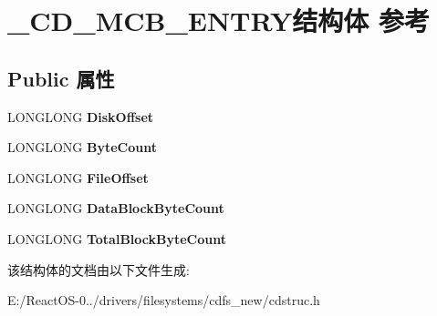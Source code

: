 \hypertarget{struct___c_d___m_c_b___e_n_t_r_y}{}\section{\+\_\+\+C\+D\+\_\+\+M\+C\+B\+\_\+\+E\+N\+T\+R\+Y结构体 参考}
\label{struct___c_d___m_c_b___e_n_t_r_y}
\subsection*{Public 属性}
\begin{DoxyCompactItemize}
\item 
\mbox{\label{struct___c_d___m_c_b___e_n_t_r_y_a5ccb3b57c1352eb1b48f175378d85a6e}} 
L\+O\+N\+G\+L\+O\+NG {\bfseries Disk\+Offset}
\item 
\mbox{\label{struct___c_d___m_c_b___e_n_t_r_y_a2e8228650e9af752e794f18417b8d61e}} 
L\+O\+N\+G\+L\+O\+NG {\bfseries Byte\+Count}
\item 
\mbox{\label{struct___c_d___m_c_b___e_n_t_r_y_aed0c738c375aa3da98fa0541e286c44e}} 
L\+O\+N\+G\+L\+O\+NG {\bfseries File\+Offset}
\item 
\mbox{\label{struct___c_d___m_c_b___e_n_t_r_y_aa401e5f28d8fa41fc50a0cd38bc90ad3}} 
L\+O\+N\+G\+L\+O\+NG {\bfseries Data\+Block\+Byte\+Count}
\item 
\mbox{\label{struct___c_d___m_c_b___e_n_t_r_y_a4985b3fc67d33b89dfb092ed5b778a67}} 
L\+O\+N\+G\+L\+O\+NG {\bfseries Total\+Block\+Byte\+Count}
\end{DoxyCompactItemize}


该结构体的文档由以下文件生成\+:\begin{DoxyCompactItemize}
\item 
E\+:/\+React\+O\+S-\/0../drivers/filesystems/cdfs\+\_\+new/cdstruc.\+h\end{DoxyCompactItemize}
